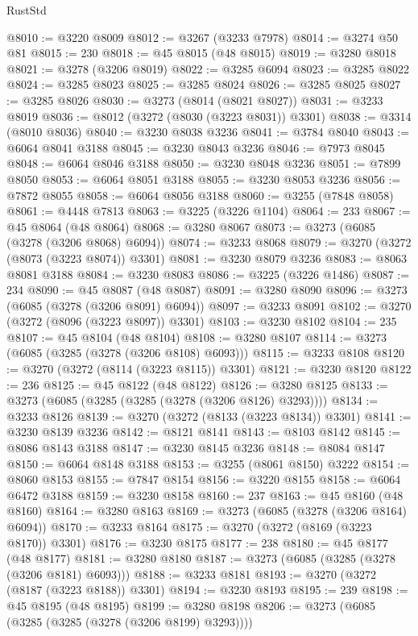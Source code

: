 \begin{lexlean}{RustStd}
\begin{coremodule}
{\begin{coremodule}
{{{{{{{{{{{{{{{{{{{{{{{{{{{{{{{{{{{{{@8010 := @3220 @8009
@8012 := @3267 (@3233 @7978)
@8014 := @3274 @50 @81
@8015 := 230
@8018 := @45 @8015 (@48 @8015)
@8019 := @3280 @8018
@8021 := @3278 (@3206 @8019)
@8022 := @3285 @6094
@8023 := @3285 @8022
@8024 := @3285 @8023
@8025 := @3285 @8024
@8026 := @3285 @8025
@8027 := @3285 @8026
@8030 := @3273 (@8014 (@8021 @8027))
@8031 := @3233 @8019
@8036 := @8012 (@3272 (@8030 (@3223 @8031)) @3301)
@8038 := @3314 (@8010 @8036)
@8040 := @3230 @8038 @3236
@8041 := @3784 @8040
@8043 := @6064 @8041 @3188
@8045 := @3230 @8043 @3236
@8046 := @7973 @8045
@8048 := @6064 @8046 @3188
@8050 := @3230 @8048 @3236
@8051 := @7899 @8050
@8053 := @6064 @8051 @3188
@8055 := @3230 @8053 @3236
@8056 := @7872 @8055
@8058 := @6064 @8056 @3188
@8060 := @3255 (@7848 @8058)
@8061 := @4448 @7813
@8063 := @3225 (@3226 @1104)
@8064 := 233
@8067 := @45 @8064 (@48 @8064)
@8068 := @3280 @8067
@8073 := @3273 (@6085 (@3278 (@3206 @8068) @6094))
@8074 := @3233 @8068
@8079 := @3270 (@3272 (@8073 (@3223 @8074)) @3301)
@8081 := @3230 @8079 @3236
@8083 := @8063 @8081 @3188
@8084 := @3230 @8083
@8086 := @3225 (@3226 @1486)
@8087 := 234
@8090 := @45 @8087 (@48 @8087)
@8091 := @3280 @8090
@8096 := @3273 (@6085 (@3278 (@3206 @8091) @6094))
@8097 := @3233 @8091
@8102 := @3270 (@3272 (@8096 (@3223 @8097)) @3301)
@8103 := @3230 @8102
@8104 := 235
@8107 := @45 @8104 (@48 @8104)
@8108 := @3280 @8107
@8114 := @3273 (@6085 (@3285 (@3278 (@3206 @8108) @6093)))
@8115 := @3233 @8108
@8120 := @3270 (@3272 (@8114 (@3223 @8115)) @3301)
@8121 := @3230 @8120
@8122 := 236
@8125 := @45 @8122 (@48 @8122)
@8126 := @3280 @8125
@8133 := @3273 (@6085 (@3285 (@3285 (@3278 (@3206 @8126) @3293))))
@8134 := @3233 @8126
@8139 := @3270 (@3272 (@8133 (@3223 @8134)) @3301)
@8141 := @3230 @8139 @3236
@8142 := @8121 @8141
@8143 := @8103 @8142
@8145 := @8086 @8143 @3188
@8147 := @3230 @8145 @3236
@8148 := @8084 @8147
@8150 := @6064 @8148 @3188
@8153 := @3255 (@8061 @8150) @3222
@8154 := @8060 @8153
@8155 := @7847 @8154
@8156 := @3220 @8155
@8158 := @6064 @6472 @3188
@8159 := @3230 @8158
@8160 := 237
@8163 := @45 @8160 (@48 @8160)
@8164 := @3280 @8163
@8169 := @3273 (@6085 (@3278 (@3206 @8164) @6094))
@8170 := @3233 @8164
@8175 := @3270 (@3272 (@8169 (@3223 @8170)) @3301)
@8176 := @3230 @8175
@8177 := 238
@8180 := @45 @8177 (@48 @8177)
@8181 := @3280 @8180
@8187 := @3273 (@6085 (@3285 (@3278 (@3206 @8181) @6093)))
@8188 := @3233 @8181
@8193 := @3270 (@3272 (@8187 (@3223 @8188)) @3301)
@8194 := @3230 @8193
@8195 := 239
@8198 := @45 @8195 (@48 @8195)
@8199 := @3280 @8198
@8206 := @3273 (@6085 (@3285 (@3285 (@3278 (@3206 @8199) @3293))))
}}}}}}}}}}}}}}}}}}}}}}}}}}}}}}}}}}}}}
\end{coremodule}}
\end{coremodule}
\end{lexlean}
